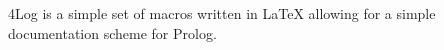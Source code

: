 {\Tex4Log} is a simple 
set of macros written in {\LaTeX} allowing 
for a simple documentation
scheme for Prolog. 